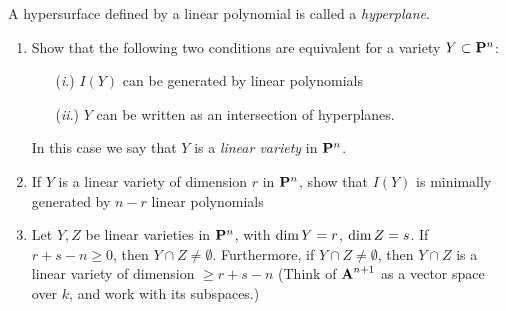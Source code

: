 \documentclass[10pt]{amsart}
\begin{document}
\begin{exercise}[2.11]
    A hypersurface defined by a linear polynomial is called a \emph{hyperplane}. 
        \begin{enumerate}
            \item Show that the following two conditions are equivalent for a variety $Y \subset \bbP^n$: 
                \begin{itemize}
                \item[(\emph{i}.)] $I(Y)$ can be generated by linear polynomials
                \item[(\emph{ii}.)] $Y$ can be written as an intersection of hyperplanes. 
                \end{itemize}
                In this case we say that $Y$ is a \emph{linear variety} in $\bbP^n$.
            \item If $Y$ is a linear variety of dimension $r$ in $\bbP^n$, show that $I(Y)$ is minimally generated by $n-r$ linear polynomials 
            \item Let $Y,Z$ be linear varieties in $\bbP^n$, with $\Dim Y = r$, $\Dim Z = s$. If $r+s-n \geq 0$, then $Y \cap Z \neq \emptyset$. 
            Furthermore, if $Y \cap Z \neq \emptyset$, then $Y \cap Z$ is a linear variety 
            of dimension $\geq r+s-n$ (Think of $\aa^{n+1}$ as a vector 
            space over $k$, and work with its subspaces.)
        \end{enumerate}
\end{exercise}
\end{document}
